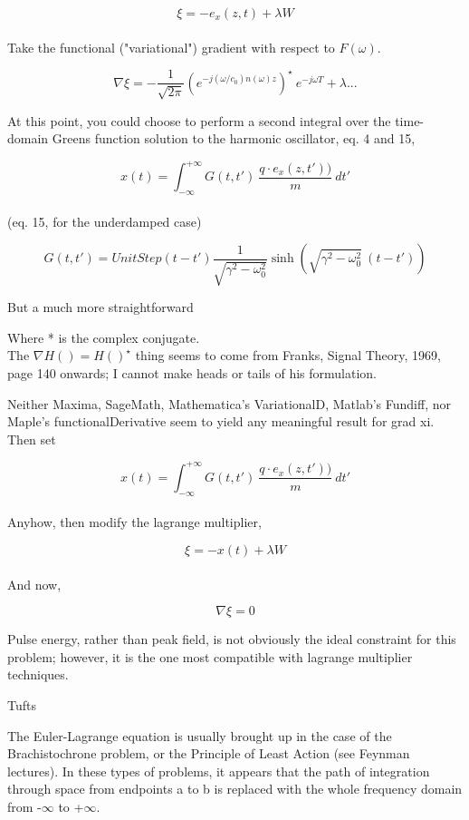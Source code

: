 \documentclass[paper.tex]{subfiles}
\begin{document}
$$\xi = -e_x(z,t) + \lambda W$$\\

Take the functional ("variational") gradient with respect to $F(\omega)$.

$$ \nabla \xi = -\frac{1}{\sqrt{2\pi}} \left(e^{- j (\omega/c_0)n(\omega)z}\right)^\star \  e^{-j\omega T} + \lambda...$$

At this point, you could choose to perform a second integral over the time-domain Greens function solution to the harmonic oscillator\cite{Complex2020}, eq. 4 and 15, 

$$x(t) = \int_{-\infty}^{+\infty}{G(t,t')\ \frac{q\cdot e_x(z,t'))}{m}\ } dt'$$\\

(eq. 15, for the underdamped case)

$$G(t,t') = UnitStep(t-t') \frac{1}{\sqrt{\gamma^2-\omega_0^2}  }\sinh\left({\sqrt{\gamma^2-\omega_0^2}}\ (t-t')\right)$$

But a much more straightforward 

Where * is the complex conjugate.\\

The $\nabla H() = H()^\star$ thing seems to come from Franks, Signal Theory, 1969, page 140 onwards; I cannot make heads or tails of his formulation.

Neither Maxima, SageMath, Mathematica's VariationalD, Matlab's Fundiff, nor Maple's 
functionalDerivative seem to yield any meaningful result for grad xi.\\

Then set

$$x(t) = \int_{-\infty}^{+\infty}{G(t,t')\ \frac{q\cdot e_x(z,t'))}{m}\ } dt'$$\\

Anyhow, then modify the lagrange multiplier,

$$\xi = -x(t) + \lambda W$$\\

And now,

$$\nabla \xi = 0$$

Pulse energy, rather than peak field, is not obviously the ideal constraint for this problem; however, it is the one most compatible with lagrange multiplier techniques.

Tufts \cite{Optimum1964}

The Euler-Lagrange equation is usually brought up in the case of the Brachistochrone problem, or 
the Principle of Least Action (see Feynman lectures). In these types of problems, it appears that 
the path of integration through space from endpoints a to b is replaced with the whole frequency 
domain from -$\infty$ to +$\infty$. 
\end{document}
